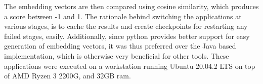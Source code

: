 The embedding vectors are then compared using cosine similarity, which produces a score between -1 and 1.
The rationale behind switching the applications at various stages, is to cache the results and create checkpoints for restarting any failed stages, easily. Additionally, since python provides better support for easy generation of embedding vectors, it was thus preferred over the Java based implementation, which is otherwise very beneficial for other tools. These applications were executed on a workstation running Ubuntu 20.04.2 LTS on top of AMD Ryzen 3 2200G, and 32GB ram.


